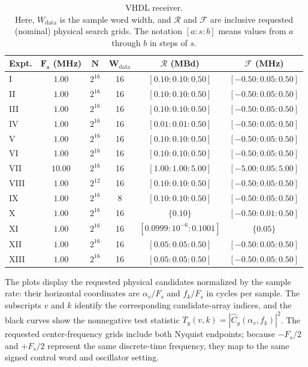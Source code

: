 %
\begin{table}[H]
\begin{center}
\caption[VHDL receiver.]{VHDL receiver. \\
Here, $W_{\mathrm{data}}$ is the sample word width, and $\mathcal{R}$ and $\mathcal{F}$ are inclusive requested (nominal) physical search grids.  The notation $[a:s:b]$ means values from $a$ through $b$ in steps of $s$.}
\label{tab:rx}
\setlength{\tabcolsep}{3pt}
\begin{tabular}{|l|c|c|c|c|c|}
\hline
\textbf{Expt.} & $\bm{F_{s}}$ \textbf{(MHz)} & $\bm{N}$ & $\bm{W_{\mathrm{data}}}$ & $\bm{\mathcal{R}}$ \textbf{(MBd)} & $\bm{\mathcal{F}}$ \textbf{(MHz)} \\
\hline
I    & $1.00$  & $2^{16}$ & 16 & $[0.10:0.10:0.50]$ & $[-0.50:0.05:0.50]$ \\
\hline
II   & $1.00$  & $2^{16}$ & 16 & $[0.10:0.10:0.50]$ & $[-0.50:0.05:0.50]$ \\
\hline
III  & $1.00$  & $2^{16}$ & 16 & $[0.10:0.10:0.50]$ & $[-0.50:0.05:0.50]$ \\
\hline
IV   & $1.00$  & $2^{16}$ & 16 & $[0.01:0.01:0.50]$ & $[-0.50:0.05:0.50]$ \\
\hline
V    & $1.00$  & $2^{16}$ & 16 & $[0.10:0.10:0.50]$ & $[-0.50:0.05:0.50]$ \\
\hline
VI   & $1.00$  & $2^{16}$ & 16 & $[0.10:0.10:0.50]$ & $[-0.50:0.05:0.50]$ \\
\hline
VII  & $10.00$ & $2^{16}$ & 16 & $[1.00:1.00:5.00]$ & $[-5.00:0.05:5.00]$ \\
\hline
VIII & $1.00$  & $2^{12}$ & 16 & $[0.10:0.10:0.50]$ & $[-0.50:0.05:0.50]$ \\
\hline
IX   & $1.00$  & $2^{16}$ & 8  & $[0.10:0.10:0.50]$ & $[-0.50:0.05:0.50]$ \\
\hline
X    & $1.00$  & $2^{16}$ & 16 & $\{0.10\}$ & $[-0.50:0.01:0.50]$ \\
\hline
XI   & $1.00$  & $2^{16}$ & 16 & $[0.0999:10^{-6}:0.1001]$ & $\{0.05\}$ \\
\hline
XII  & $1.00$  & $2^{16}$ & 16 & $[0.05:0.05:0.50]$ & $[-0.50:0.05:0.50]$ \\
\hline
XIII & $1.00$  & $2^{16}$ & 16 & $[0.05:0.05:0.50]$ & $[-0.50:0.05:0.50]$ \\
\hline
\end{tabular}
\end{center}
\end{table}

The plots display the requested physical candidates normalized by the sample rate: their horizontal coordinates are $\alpha_v/F_s$ and $f_k/F_s$ in cycles per sample.  The subscripts $v$ and $k$ identify the corresponding candidate-array indices, and the black curves show the nonnegative test statistic $T_y(v,k)=|\widehat{C}_{y}(\alpha_v,f_k)|^2$.  The requested center-frequency grids include both Nyquist endpoints; because $-F_s/2$ and $+F_s/2$ represent the same discrete-time frequency, they map to the same signed control word and oscillator setting.


